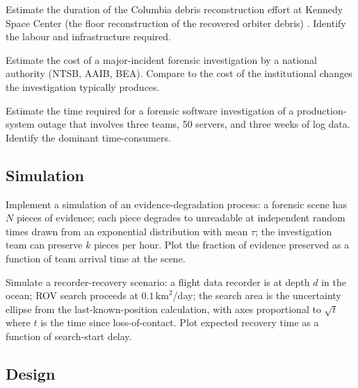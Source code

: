 \begin{exercise}
Estimate the duration of the Columbia debris reconstruction effort at Kennedy Space Center (the floor reconstruction of the recovered orbiter debris) \cite{acc:caib-columbia}. Identify the labour and infrastructure required.
\end{exercise}

\begin{exercise}
Estimate the cost of a major-incident forensic investigation by a national authority (NTSB, AAIB, BEA). Compare to the cost of the institutional changes the investigation typically produces.
\end{exercise}

\begin{exercise}
Estimate the time required for a forensic software investigation of a production-system outage that involves three teams, 50 servers, and three weeks of log data. Identify the dominant time-consumers.
\end{exercise}

\subsection*{Simulation}

\begin{exercise}
Implement a simulation of an evidence-degradation process: a forensic scene has $N$ pieces of evidence; each piece degrades to unreadable at independent random times drawn from an exponential distribution with mean $\tau$; the investigation team can preserve $k$ pieces per hour. Plot the fraction of evidence preserved as a function of team arrival time at the scene.
\end{exercise}

\begin{exercise}
Simulate a recorder-recovery scenario: a flight data recorder is at depth $d$ in the ocean; ROV search proceeds at $0.1\,\text{km}^2$/day; the search area is the uncertainty ellipse from the last-known-position calculation, with axes proportional to $\sqrt{t}$ where $t$ is the time since loss-of-contact. Plot expected recovery time as a function of search-start delay.
\end{exercise}

\subsection*{Design}

